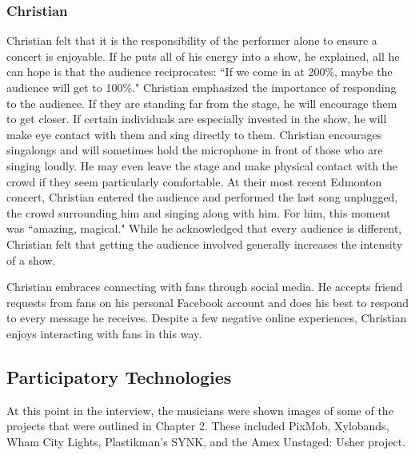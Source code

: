 \subsubsection{Christian}
Christian felt that it is the responsibility of the performer alone to ensure a concert is enjoyable. If he puts all of his energy into a show, he explained, all he can hope is that the audience reciprocates: ``If we come in at 200\%, maybe the audience will get to 100\%." Christian emphasized the importance of responding to the audience. If they are standing far from the stage, he will encourage them to get closer. If certain individuals are especially invested in the show, he will make eye contact with them and sing directly to them. Christian encourages singalongs and will sometimes hold the microphone in front of those who are singing loudly. He may even leave the stage and make physical contact with the crowd if they seem particularly comfortable. At their most recent Edmonton concert, Christian entered the audience and performed the last song unplugged, the crowd surrounding him and singing along with him. For him, this moment was ``amazing, magical." While he acknowledged that every audience is different, Christian felt that getting the audience involved generally increases the intensity of a show.

Christian embraces connecting with fans through social media. He accepts friend requests from fans on his personal Facebook account and does his best to respond to every message he receives. Despite a few negative online experiences, Christian enjoys interacting with fans in this way.

\subsection{Participatory Technologies}

At this point in the interview, the musicians were shown images of some of the projects that were outlined in Chapter 2. These included PixMob, Xylobands, Wham City Lights, Plastikman's SYNK, and the Amex Unstaged: Usher project.

